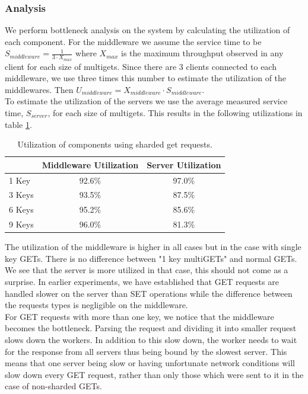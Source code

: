 \documentclass[11pt,a4paper]{article}
\begin{document}
\subsubsection{Analysis}
We perform bottleneck analysis on the system by calculating the utilization of each component. For the middleware we assume the service time to be $S_{middleware} = \frac{1}{3\cdot X_{max}}$ where $X_{max}$ is the maximum throughput observed in any client for each size of multigets. Since there are 3 clients connected to each middleware, we use three times this number to estimate the utilization of the middlewares. Then $U_{middleware} = X_{middleware} \cdot S_{middleware}$.\\

To estimate the utilization of the servers we use the average measured service time, $S_{server}$, for each size of multigets. This results in the following utilizations in table \ref{table:51_util}.

\begin{table}[h]
\centering
\caption{Utilization of components using sharded get requests.}
\label{table:51_util}
\begin{tabular}{l|cc}
       & \multicolumn{1}{l}{Middleware Utilization} & \multicolumn{1}{l}{Server Utilization} \\ \hline
1 Key  & 92.6\%                                     & 97.0\%                                 \\
3 Keys & 93.5\%                                     & 87.5\%                                 \\
6 Keys & 95.2\%                                     & 85.6\%                                 \\
9 Keys & 96.0\%                                     & 81.3\%                                
\end{tabular}
\end{table}

The utilization of the middleware is higher in all cases but in the case with single key GETs. There is no difference between "1 key multiGETs" and normal GETs. We see that the server is more utilized in that case, this should not come as a surprise. In earlier experiments, we have established that GET requests are handled slower on the server than SET operations while the difference between the requests types is negligible on the middleware.\\

For GET requests with more than one key, we notice that the middleware becomes the bottleneck. Parsing the request and dividing it into smaller request slows down the workers. In addition to this slow down, the worker needs to wait for the response from all servers thus being bound by the slowest server. This means that one server being slow or having unfortunate network conditions will slow down every GET request, rather than only those which were sent to it in the case of non-sharded GETs.
\end{document}
